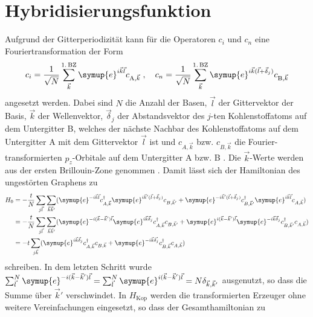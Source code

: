 \section{Hybridisierungsfunktion}
\label{sec:calc_greensfunction}
Aufgrund der Gitterperiodizität kann für die Operatoren $c_i$ und $c_n$ eine Fouriertransformation der Form 
\begin{equation}
    c_i = \frac{1}{\sqrt{N}} \sum_{\vec{k}}^{1. \, \text{BZ}} \symup{e}^{i\vec{k}\vec{l}} c_{\text{A}, \vec{k}} \; , 
    \quad c_n = \frac{1}{\sqrt{N}} \sum_{\vec{k}}^{1. \, \text{BZ}} \symup{e}^{i\vec{k}(\vec{l}+\vec{\delta}_j)} c_{\text{B}, \vec{k}} \label{eqn:fourier_ladder}
\end{equation}
angesetzt werden.
Dabei sind $N$ die Anzahl der Basen, $\vec{l}$ der Gittervektor der Basis, $\vec{k}$ der Wellenvektor, $\vec{\delta}_j$ der Abstandsvektor
des $j$-ten Kohlenstoffatoms auf dem Untergitter B, welches der nächste Nachbar des Kohlenstoffatoms auf dem Untergitter A mit dem Gittervektor $\vec{l}$ ist 
und $c_{A, \vec{k}}$ bzw. $c_{B, \vec{k}}$ die Fourier-transformierten $p_z$-Orbitale auf dem Untergitter A bzw. B \cite{anders-fkt}.
Die $\vec{k}$-Werte werden aus der ersten Brillouin-Zone genommen \cite{anders-fkt}.
Damit lässt sich der Hamiltonian des ungestörten Graphens zu 
\begin{align*}
    H_0 &= -\frac{t}{N} \sum_{j\vec{l}} \sum_{\vec{k}\vec{k}'} ( \symup{e}^{-i\vec{k}\vec{l}}c^\dagger_{A,\vec{k}} 
    \symup{e}^{i\vec{k}'(\vec{l}+\vec{\delta}_j)}c_{B,\vec{k}'} + \symup{e}^{-i\vec{k}'(\vec{l}+\vec{\delta}_j)} c^\dagger_{B,\vec{k}'} 
    \symup{e}^{i\vec{k}\vec{l}}c_{A,\vec{k}}) \\
    &= -\frac{t}{N} \sum_{j\vec{l}} \sum_{\vec{k}\vec{k}'} ( \symup{e}^{-i(\vec{k}- \vec{k}')\vec{l}}\symup{e}^{i\vec{k}\vec{\delta}_j}c^\dagger_{A,\vec{k}} c_{B,\vec{k}'} + 
    \symup{e}^{i(\vec{k}- \vec{k}')\vec{l}} \symup{e}^{-i\vec{k}\vec{\delta}_j} c^\dagger_{B,\vec{k}'}c_{A,\vec{k}}) \\
    &= -t \sum_{j\vec{k}} ( \symup{e}^{i\vec{k}\vec{\delta}_j}c^\dagger_{A,\vec{k}} c_{B,\vec{k}} + 
    \symup{e}^{-i\vec{k}\vec{\delta_j}} c^\dagger_{B,\vec{k}}c_{A,\vec{k}})
\end{align*}
schreiben.
In dem letzten Schritt wurde $\sum_{\vec{l}}^N \symup{e}^{-i(\vec{k}- \vec{k}')\vec{l}} 
= \sum_{\vec{l}}^N \symup{e}^{i(\vec{k}- \vec{k}')\vec{l}} = N\delta_{\vec{k}, \vec{k}'}$ ausgenutzt, so dass die Summe über $\vec{k}'$ verschwindet.
In $H_\text{Kop}$ werden die transformierten Erzeuger ohne weitere Vereinfachungen eingesetzt,  so dass der Gesamthamiltonian zu 
